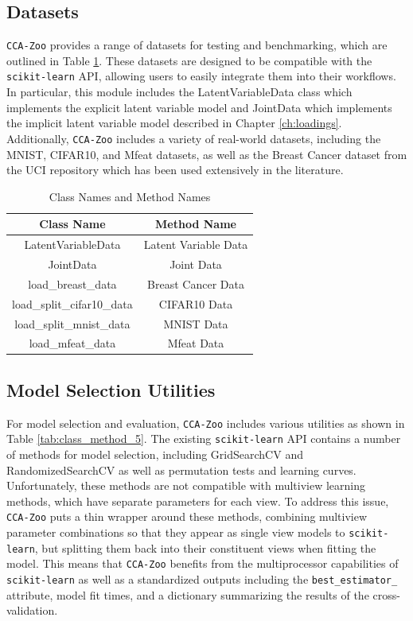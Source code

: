 \subsection{Datasets}
\texttt{CCA-Zoo} provides a range of datasets for testing and benchmarking, which are outlined in Table \ref{tab:class_method_6}.
These datasets are designed to be compatible with the \texttt{scikit-learn} API, allowing users to easily integrate them into their workflows.
In particular, this module includes the LatentVariableData class which implements the explicit latent variable model and JointData which implements the implicit latent variable model described in Chapter \ref{ch:loadings}.
Additionally, \texttt{CCA-Zoo} includes a variety of real-world datasets, including the MNIST, CIFAR10, and Mfeat datasets, as well as the Breast Cancer dataset from the UCI repository which has been used extensively in the literature\cite{witten2009penalized}.

\begin{table}[ht]
    \centering
    \begin{tabular}{|c|c|}
        \hline
        Class Name & Method Name \\
        \hline
        LatentVariableData & Latent Variable Data \\
        JointData & Joint Data \\
        load\_breast\_data & Breast Cancer Data \\
        load\_split\_cifar10\_data & CIFAR10 Data \\
        load\_split\_mnist\_data & MNIST Data \\
        load\_mfeat\_data & Mfeat Data \\
        \hline
    \end{tabular}
    \caption{Class Names and Method Names}\label{tab:class_method_6}
\end{table}

\subsection{Model Selection Utilities}
For model selection and evaluation, \texttt{CCA-Zoo} includes various utilities as shown in Table \ref{tab:class_method_5}.
The existing \texttt{scikit-learn} API contains a number of methods for model selection, including GridSearchCV and RandomizedSearchCV as well as permutation tests and learning curves.
Unfortunately, these methods are not compatible with multiview learning methods, which have separate parameters for each view.
To address this issue, \texttt{CCA-Zoo} puts a thin wrapper around these methods, combining multiview parameter combinations so that they appear as single view models to \texttt{scikit-learn}, but splitting them back into their constituent views when fitting the model.
This means that \texttt{CCA-Zoo} benefits from the multiprocessor capabilities of \texttt{scikit-learn} as well as a standardized outputs including the \texttt{best\_estimator\_} attribute, model fit times, and a dictionary summarizing the results of the cross-validation.

